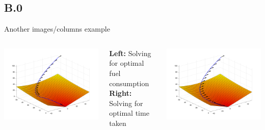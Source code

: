 \documentclass[]{beamer}
\begin{document}
\subsection{B.0}

\begin{frame}{Another images/columns example}
\begin{columns}
\begin{column}{0.35\textwidth}
\includegraphics[width=\textwidth]{plots/min_fuel.png}
\end{column}
\begin{column}{0.3\textwidth}
\textbf{Left:} Solving for optimal fuel consumption \textbf{Right:} Solving for optimal time taken
\end{column}
\begin{column}{0.35\textwidth}
\includegraphics[width=\textwidth]{plots/min_time.png}
\end{column}
\end{columns}
\end{frame}
\end{document}
